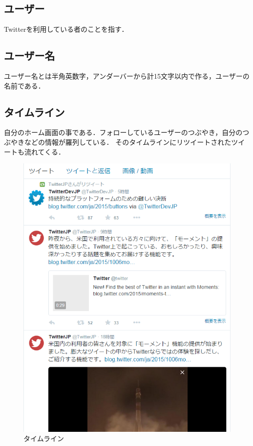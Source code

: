 \subsection{ユーザー}

Twitterを利用している者のことを指す．

\subsection{ユーザー名}

ユーザー名とは半角英数字，アンダーバーから計15文字以内で作る，ユーザーの名前である．

\subsection{タイムライン}

自分のホーム画面の事である．フォローしているユーザーのつぶやき，自分のつぶやきなどの情報が羅列している．
そのタイムラインにリツイートされたツイートも流れてくる．

\begin{figure}[H]
\centering
\includegraphics[width=15cm]{twitterTL.png}
\caption{タイムライン}\label{タイムライン}
\end{figure}


